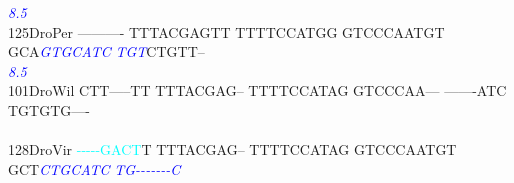\documentclass[11pt,twoside,reqno,a4paper]{article}
\begin{document}
{\hspace*{4\charwidth}\hspace*{7\charwidth}\hspace*{1\charwidth}\hspace*{1\charwidth}\hspace*{1\charwidth}\hspace*{1\charwidth}\hspace*{43\charwidth}\textit{\textcolor{blue}{8.5}}\hspace*{1\charwidth}\hspace*{1\charwidth}\\
125\hspace*{1\charwidth}DroPer	----------	TTTACGAGTT	TTTTCCATGG	GTCCCAATGT	GCA\textit{\textcolor{blue}{G}}\textit{\textcolor{blue}{T}}\textit{\textcolor{blue}{G}}\textit{\textcolor{blue}{C}}\textit{\textcolor{blue}{A}}\textit{\textcolor{blue}{T}}\textit{\textcolor{blue}{C}}	\textit{\textcolor{blue}{T}}\textit{\textcolor{blue}{G}}\textit{\textcolor{blue}{T}}CTGTT--	\\
\hspace*{4\charwidth}\hspace*{7\charwidth}\hspace*{1\charwidth}\hspace*{1\charwidth}\hspace*{1\charwidth}\hspace*{1\charwidth}\hspace*{43\charwidth}\textit{\textcolor{blue}{8.5}}\hspace*{1\charwidth}\hspace*{1\charwidth}\\
101\hspace*{1\charwidth}DroWil	CTT-----TT	TTTACGAG--	TTTTCCATAG	GTCCCAA---	-------ATC	TGTGTG----	\\
\hspace*{4\charwidth}\hspace*{7\charwidth}\hspace*{1\charwidth}\hspace*{1\charwidth}\hspace*{1\charwidth}\hspace*{1\charwidth}\hspace*{1\charwidth}\hspace*{1\charwidth}\\
128\hspace*{1\charwidth}DroVir	\textcolor{cyan}{-}\textcolor{cyan}{-}\textcolor{cyan}{-}\textcolor{cyan}{-}\textcolor{cyan}{-}\textcolor{cyan}{G}\textcolor{cyan}{A}\textcolor{cyan}{C}\textcolor{cyan}{T}T	TTTACGAG--	TTTTCCATAG	GTCCCAATGT	GCT\textit{\textcolor{blue}{C}}\textit{\textcolor{blue}{T}}\textit{\textcolor{blue}{G}}\textit{\textcolor{blue}{C}}\textit{\textcolor{blue}{A}}\textit{\textcolor{blue}{T}}\textit{\textcolor{blue}{C}}	\textit{\textcolor{blue}{T}}\textit{\textcolor{blue}{G}}\textit{\textcolor{blue}{-}}\textit{\textcolor{blue}{-}}\textit{\textcolor{blue}{-}}\textit{\textcolor{blue}{-}}\textit{\textcolor{blue}{-}}\textit{\textcolor{blue}{-}}\textit{\textcolor{blue}{-}}\textit{\textcolor{blue}{C}}	\\
}
\end{document}
